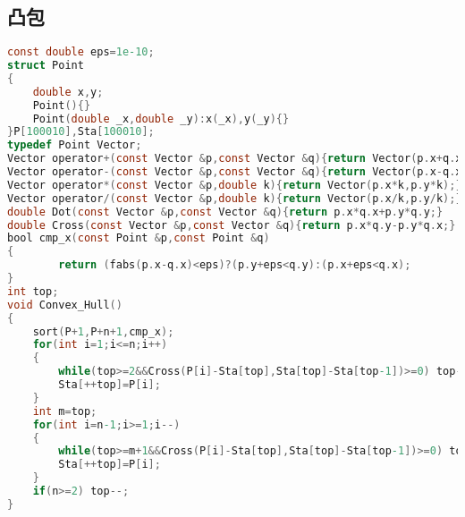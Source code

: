 \subsection{凸包}
\begin{lstlisting}[language=C]
const double eps=1e-10;
struct Point
{
    double x,y;
    Point(){}
    Point(double _x,double _y):x(_x),y(_y){}
}P[100010],Sta[100010];
typedef Point Vector;
Vector operator+(const Vector &p,const Vector &q){return Vector(p.x+q.x,p.y+q.y);}
Vector operator-(const Vector &p,const Vector &q){return Vector(p.x-q.x,p.y-q.y);}
Vector operator*(const Vector &p,double k){return Vector(p.x*k,p.y*k);}
Vector operator/(const Vector &p,double k){return Vector(p.x/k,p.y/k);}
double Dot(const Vector &p,const Vector &q){return p.x*q.x+p.y*q.y;}
double Cross(const Vector &p,const Vector &q){return p.x*q.y-p.y*q.x;}
bool cmp_x(const Point &p,const Point &q) 
{
        return (fabs(p.x-q.x)<eps)?(p.y+eps<q.y):(p.x+eps<q.x);
}
int top;
void Convex_Hull()
{
    sort(P+1,P+n+1,cmp_x);
    for(int i=1;i<=n;i++)
    {   
        while(top>=2&&Cross(P[i]-Sta[top],Sta[top]-Sta[top-1])>=0) top--;
        Sta[++top]=P[i];
    }   
    int m=top;
    for(int i=n-1;i>=1;i--)
    {   
        while(top>=m+1&&Cross(P[i]-Sta[top],Sta[top]-Sta[top-1])>=0) top--;
        Sta[++top]=P[i];
    }   
    if(n>=2) top--;
}
\end{lstlisting}